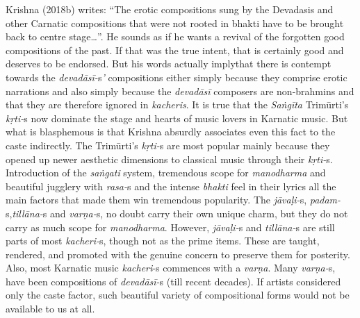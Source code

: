 Krishna (2018b) writes: “The erotic compositions sung by the Devadasis and other Carnatic compositions that were not rooted in bhakti have to be brought back to centre stage…”. He sounds as if he wants a revival of the forgotten good compositions of the past. If that was the true intent, that is certainly good and deserves to be endorsed. But his words actually implythat there is contempt towards the \textit{devadāsī-}s\textit{’} compositions either simply because they comprise erotic narrations and also simply because the \textit{devadāsī} composers are non-brahmins and that they are therefore ignored in \textit{kacheris}. It is true that the \textit{Saṅgīta} Trimūrti’s \textit{kṛti-}s now dominate the stage and hearts of music lovers in Karnatic music. But what is blasphemous is that Krishna absurdly associates even this fact to the caste indirectly. The Trimūrti’s \textit{kṛti-}s are most popular mainly because they opened up newer aesthetic dimensions to classical music through their \textit{kṛti-}s. Introduction of the \textit{saṅgati} system, tremendous scope for \textit{manodharma} and beautiful jugglery with \textit{rasa-}s and the intense \textit{bhakti} feel in their lyrics all the main factors that made them win tremendous popularity. The \textit{jāvaḷi-}s, \textit{padam-}s,\textit{tillāna-}s and \textit{varṇa-}s, no doubt carry their own unique charm, but they do not carry as much scope for \textit{manodharma}. However, \textit{jāvaḷi-}s and \textit{tillāna-}s are still parts of most \textit{kacheri-}s, though not as the prime items. These are taught, rendered, and promoted with the genuine concern to preserve them for posterity. Also, most Karnatic music \textit{kacheri}-s commences with a \textit{varṇa}. Many \textit{varṇa-}s, have been compositions of \textit{devadāsī-}s (till recent decades). If artists considered only the caste factor, such beautiful variety of compositional forms would not be available to us at all.

\vspace{-.3cm}

